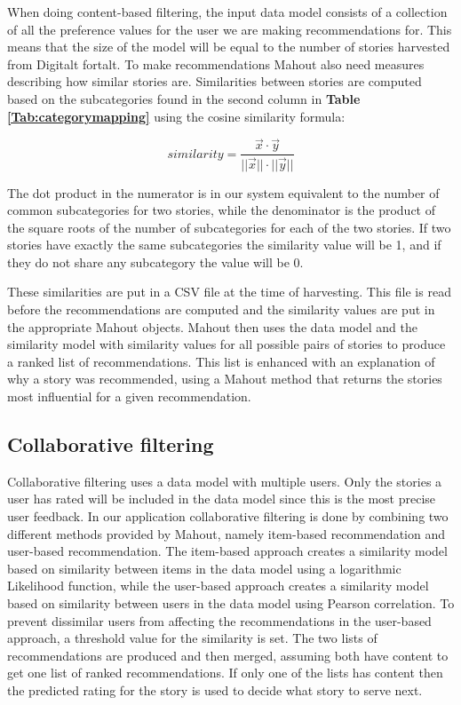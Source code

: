 When doing content-based filtering, the input data model consists of a collection of all the preference values for the user we are making recommendations for. This means that the size of the model will be equal to the number of stories harvested from Digitalt fortalt. To make recommendations Mahout also need measures describing how similar stories are. Similarities between stories are computed based on the subcategories found in the second column in \textbf{Table \ref{Tab:categorymapping}} using the cosine similarity formula: 

\begin{equation}
similarity = \frac{\vec{x}\cdot\vec{y}}{||\vec{x}||\cdot||\vec{y}||}
\end{equation}

The dot product in the numerator is in our system equivalent to the number of common subcategories for two stories, while the denominator is the product of the square roots of the number of subcategories for each of the two stories. If two stories have exactly the same subcategories the similarity value will be 1, and if they do not share any subcategory the value will be 0. \newline

These similarities are put in a CSV file at the time of harvesting. This file is read before the recommendations are computed and the similarity values are put in the appropriate Mahout objects. Mahout then uses the data model and the similarity model with similarity values for all possible pairs of stories to produce a ranked list of recommendations. This list is enhanced with an explanation of why a story was recommended, using a Mahout method that returns the stories most influential for a given recommendation.


\subsection{Collaborative filtering}

Collaborative filtering uses a data model with multiple users. Only the stories a user has rated will be included in the data model since this is the most precise user feedback. In our application collaborative filtering is done by combining two different methods provided by Mahout, namely item-based recommendation and user-based recommendation. The item-based approach creates a similarity model based on similarity between items in the data model using a logarithmic Likelihood function, while the user-based approach creates a similarity model based on similarity between users in the data model using Pearson correlation. To prevent dissimilar users from affecting the recommendations in the user-based approach, a threshold value for the similarity is set. The two lists of recommendations are produced and then merged, assuming both have content to get one list of ranked recommendations. If only one of the lists has content then the predicted rating for the story is used to decide what story to serve next.\newline

